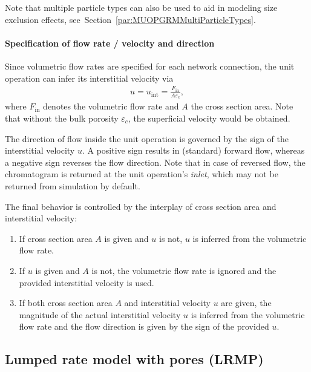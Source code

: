 Note that multiple particle types can also be used to aid in modeling size exclusion effects, see~Section~\ref{par:MUOPGRMMultiParticleTypes}.

\paragraph{Specification of flow rate / velocity and direction}
\label{par:MUOPGRMflow}

Since volumetric flow rates are specified for each network connection, the unit operation can infer its interstitial velocity via
\begin{align*}
	u = u_{\text{int}} = \frac{F_{\text{in}}}{A \varepsilon_c},
\end{align*}
where $F_{\text{in}}$ denotes the volumetric flow rate and $A$ the cross section area.
Note that without the bulk porosity $\varepsilon_c$, the superficial velocity would be obtained.

The direction of flow inside the unit operation is governed by the sign of the interstitial velocity $u$.
A positive sign results in (standard) forward flow, whereas a negative sign reverses the flow direction.
Note that in case of reversed flow, the chromatogram is returned at the unit operation's \emph{inlet}, which may not be returned from simulation by default.

The final behavior is controlled by the interplay of cross section area and interstitial velocity:
\begin{enumerate}
	\item If cross section area $A$ is given and $u$ is not, $u$ is inferred from the volumetric flow rate.
	\item If $u$ is given and $A$ is not, the volumetric flow rate is ignored and the provided interstitial velocity is used.
	\item If both cross section area $A$ and interstitial velocity $u$ are given, the magnitude of the actual interstitial velocity $u$ is inferred from the volumetric flow rate and the flow direction is given by the sign of the provided $u$.
\end{enumerate}

\subsection{Lumped rate model with pores (LRMP)}\label{sec:MUOPLRMP}

